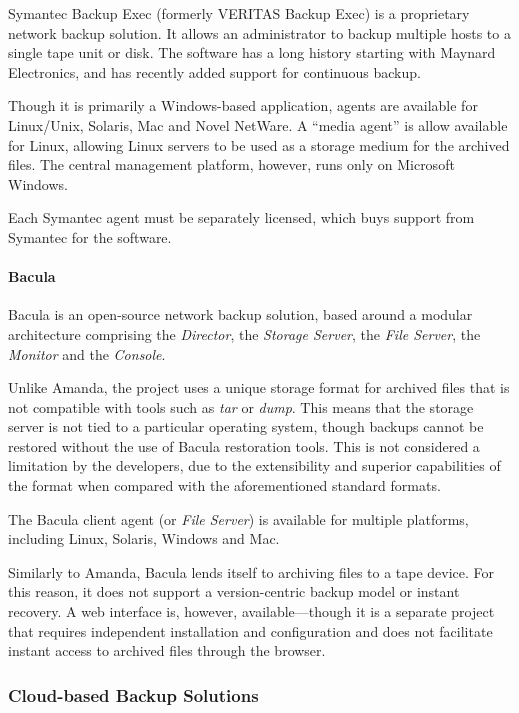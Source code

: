 \begin{bibunit}[plain]
Symantec Backup Exec (formerly VERITAS Backup Exec) is a proprietary network
backup solution. It allows an administrator to backup multiple hosts to
a single tape unit or disk. The software has a long history starting with
Maynard Electronics, and has recently added support for continuous backup.

Though it is primarily a Windows-based application, agents are available for
Linux/Unix, Solaris, Mac and Novel NetWare. A ``media agent'' is allow
available for Linux, allowing Linux servers to be used as a storage medium for
the archived files. The central management platform, however, runs only on
Microsoft Windows.

Each Symantec agent must be separately licensed, which buys support from
Symantec for the software.

\paragraph{Bacula}

Bacula is an open-source network backup solution, based around a modular
architecture comprising the \emph{Director}, the \emph{Storage Server}, the
\emph{File Server}, the \emph{Monitor} and the \emph{Console}.

Unlike Amanda, the project uses a unique storage format for archived files that
is not compatible with tools such as \emph{tar} or \emph{dump}. This means that
the storage server is not tied to a particular operating system, though backups
cannot be restored without the use of Bacula restoration tools. This is not
considered a limitation by the developers, due to the extensibility and
superior capabilities of the format when compared with the aforementioned
standard formats.

The Bacula client agent (or \emph{File Server}) is available for multiple platforms,
including Linux, Solaris, Windows and Mac.

Similarly to Amanda, Bacula lends itself to archiving files to a tape device.
For this reason, it does not support a version-centric backup model or instant
recovery. A web interface is, however, available---though it is a separate
project that requires independent installation and configuration and does not
facilitate instant access to archived files through the browser.

\subsubsection{Cloud-based Backup Solutions}


\end{bibunit}
